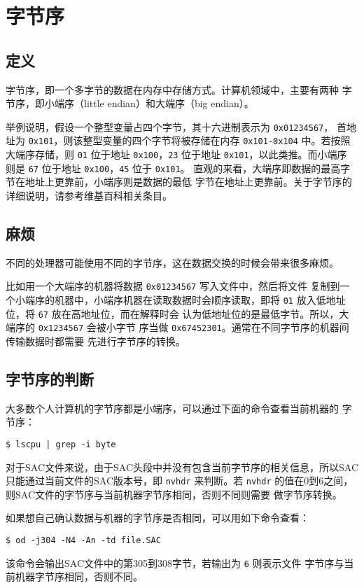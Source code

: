 \section{字节序}
\label{sec:endian}
\subsection{定义}
字节序，即一个多字节的数据在内存中存储方式。计算机领域中，主要有两种
字节序，即小端序（little endian）和大端序（big endian）。

举例说明，假设一个整型变量占四个字节，其十六进制表示为 \texttt{0x01234567}，
首地址为 \texttt{0x101}，则该整型变量的四个字节将被存储在内存
\texttt{0x101-0x104} 中。若按照大端序存储，则 \texttt{01} 位于地址
\texttt{0x100}，\texttt{23} 位于地址 \texttt{0x101}，以此类推。而小端序
则是 \texttt{67} 位于地址 \texttt{0x100}，\texttt{45} 位于 \texttt{0x101}。
直观的来看，大端序即数据的最高字节在地址上更靠前，小端序则是数据的最低
字节在地址上更靠前。关于字节序的详细说明，请参考维基百科相关条目。

\subsection{麻烦}
不同的处理器可能使用不同的字节序，这在数据交换的时候会带来很多麻烦。

比如用一个大端序的机器将数据 \texttt{0x01234567} 写入文件中，然后将文件
复制到一个小端序的机器中，小端序机器在读取数据时会顺序读取，即将
\texttt{01} 放入低地址位，将 \texttt{67} 放在高地址位，而在解释时会
认为低地址位的是最低字节。所以，大端序的 \texttt{0x1234567} 会被小字节
序当做 \texttt{0x67452301}。通常在不同字节序的机器间传输数据时都需要
先进行字节序的转换。

\subsection{字节序的判断}
大多数个人计算机的字节序都是小端序，可以通过下面的命令查看当前机器的
字节序：
\begin{verbatim}
$ lscpu | grep -i byte
\end{verbatim}

对于SAC文件来说，由于SAC头段中并没有包含当前字节序的相关信息，所以SAC
只能通过当前文件的SAC版本号，即 \texttt{nvhdr} 来判断。若 \texttt{nvhdr}
的值在0到6之间，则SAC文件的字节序与当前机器字节序相同，否则不同则需要
做字节序转换。

如果想自己确认数据与机器的字节序是否相同，可以用如下命令查看：
\begin{verbatim}
$ od -j304 -N4 -An -td file.SAC
\end{verbatim}
该命令会输出SAC文件中的第305到308字节，若输出为 \texttt{6} 则表示文件
字节序与当前机器字节序相同，否则不同。

